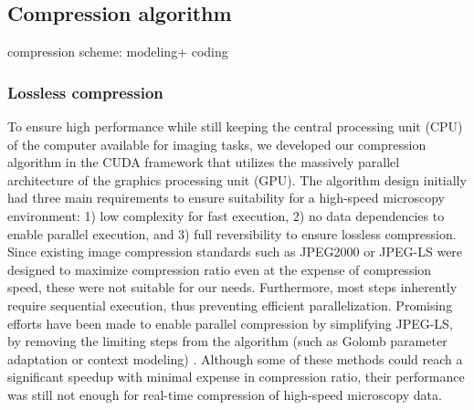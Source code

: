 





    


    

  \subsection{Compression algorithm}

    compression scheme: modeling+ coding \cite{rissanen_universal_1981}

    
    \subsubsection{Lossless compression}
    To ensure high performance while still keeping the central processing unit (CPU) of the computer available for imaging tasks, we developed our compression algorithm in the CUDA framework \cite{nickolls_scalable_2008} that utilizes the massively parallel architecture of the graphics processing unit (GPU). The algorithm design initially had three main requirements to ensure suitability for a high-speed microscopy environment: 1) low complexity for fast execution, 2) no data dependencies to enable parallel execution, and 3) full reversibility to ensure lossless compression. Since existing image compression standards such as JPEG2000 \cite{adams_jpeg-2000_2001} or JPEG-LS \cite{weinberger_loco-i_2000} were designed to maximize compression ratio even at the expense of compression speed, these were not suitable for our needs. Furthermore, most steps inherently require sequential execution, thus preventing efficient parallelization. Promising efforts have been made to enable parallel compression by simplifying JPEG-LS, by removing the limiting steps from the algorithm (such as Golomb parameter adaptation or context modeling) \cite{wang_fast_2012,starosolski_simple_2007}. Although some of these methods could reach a significant speedup with minimal expense in compression ratio, their performance was still not enough for real-time compression of high-speed microscopy data.

